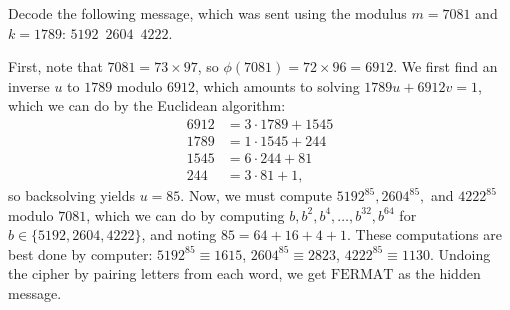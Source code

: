 \documentclass{article}
\begin{document}
\begin{exercise}[Chapter 18, \#1]
Decode the following message, which was sent using the modulus $m = 7081$ and $k = 1789$: $5192 \,\,\, 2604 \,\,\, 4222.$
\end{exercise}
\begin{solution}
First, note that $7081 = 73\times 97$, so $\phi(7081) = 72\times 96 = 6912$. We first find an inverse $u$ to $1789$ modulo $6912$, which amounts to solving $1789u + 6912v = 1$, which we can do by the Euclidean algorithm:
\begin{align*}
    6912 &= 3\cdot 1789 + 1545 \\
    1789 &= 1\cdot 1545 + 244 \\
    1545 &= 6\cdot 244 + 81 \\
    244 &= 3\cdot 81 + 1,
\end{align*}
so backsolving yields $u = 85$. Now, we must compute $5192^{85}, 2604^{85},$ and $4222^{85}$ modulo $7081$, which we can do by computing $b, b^2, b^4, \ldots, b^{32}, b^{64}$ for $b\in \{5192, 2604, 4222\}$, and noting
$85 = 64 + 16 + 4+1.$
These computations are best done by computer: $5192^{85} \equiv 1615$, $2604^{85}\equiv 2823$, $4222^{85}\equiv 1130$. Undoing the cipher by pairing letters from each word, we get $\boxed{\text{FERMAT}}$ as the hidden message.
\end{solution}
\end{document}
